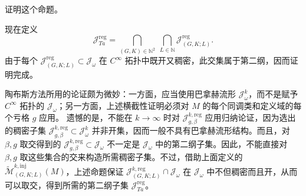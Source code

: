 \begin{exercise}\label{ex:taubes-open-dense-regular-values}
证明这个命题。
\end{exercise}

现在定义
\[
 \mathcal J_{Ta}^{\mathrm{reg}}=
 \bigcap_{(G,K)\in\mathbb N^2}\
 \bigcap_{L\in\mathbb N}\mathcal J_{(G,K;L)}^{\mathrm{reg}}.
\]
由于每个
$\mathcal J_{(G,K;L)}^{\mathrm{reg}}\subset\mathcal J_\omega$ 在
$C^\infty$ 拓扑中既开又稠密，此交集属于第二纲，因而证明完成。

\begin{remark}\label{rem:taubes-category-subtlety}
陶布斯方法所用的论证颇为微妙：一方面，应当使用巴拿赫流形
$\mathcal J_\omega^k$，而不是赋予 $C^\infty$ 拓扑的
$\mathcal J_\omega$；另一方面，上述横截性证明必须对 $M$ 的每个同调类和定义域的每个亏格 $g$ 应用。
遗憾的是，不能在 $k\to\infty$ 时对
$\mathcal J_{g,\beta}^{k,\mathrm{reg}}$ 应用归纳论证，因为选出的稠密子集
$\mathcal J_{g,\beta}^{k,\mathrm{reg}}\subset\mathcal J_\omega^k$ 并非开集，因而一般不具有巴拿赫流形结构。而且，对
$\beta,g$ 取交得到的
$\mathcal J_{g,\beta}^{k,\mathrm{reg}}\subset\mathcal J_\omega$ 不一定是
$\mathcal J_\omega$ 中的第二纲子集。因此，不能直接对 $\beta,g$ 取这些集合的交来构造所需稠密子集。不过，借助上面定义的
$\widetilde{\mathcal M}_{(G,K;L)}^{k,\mathrm{inj}}(M)$，上述命题保证
$\mathcal J_{(G,K;L)}^{k,\mathrm{reg}}\cap\mathcal J_\omega$ 在
$\mathcal J_\omega$ 中不但稠密而且开，从而可以取交，得到所需的第二纲子集
$\mathcal J_{Ta}^{\mathrm{reg}}$。
\end{remark}
